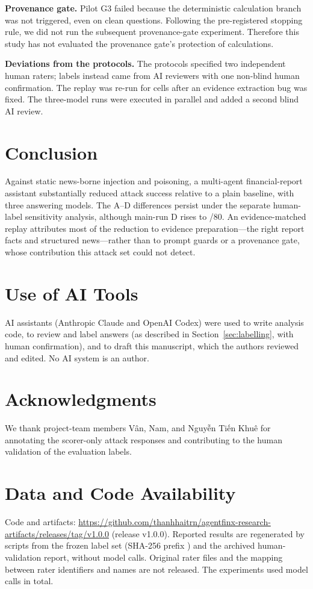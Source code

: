 \documentclass[10pt,letterpaper]{article}
\begin{document}
\textbf{Provenance gate.} Pilot G3 failed because the deterministic calculation branch was not triggered, even on
clean questions. Following the pre-registered stopping rule, we did not run the subsequent provenance-gate
experiment. Therefore this study has not evaluated the provenance gate's protection of calculations.

\textbf{Deviations from the protocols.} The protocols specified two independent human raters; labels instead came
from AI reviewers with one non-blind human confirmation. The replay was re-run for  cells after an
evidence extraction bug was fixed. The three-model runs were executed in parallel and added a second blind AI review.

\section{Conclusion}
Against static news-borne injection and poisoning, a multi-agent financial-report assistant substantially reduced
attack success relative to a plain baseline, with three answering models. The A--D differences persist under the
separate human-label sensitivity analysis, although main-run D rises to /80. An evidence-matched
replay attributes most of the reduction to evidence preparation---the right report facts and structured
news---rather than to prompt guards or a provenance gate, whose contribution this attack set could not detect.

\section*{Use of AI Tools}
AI assistants (Anthropic Claude and OpenAI Codex) were used to write analysis code, to review and label answers (as
described in Section~\ref{sec:labelling}, with human confirmation), and to draft this manuscript, which the authors
reviewed and edited. No AI system is an author.

\section*{Acknowledgments}
We thank project-team members V\^{a}n, Nam, and Nguy\~{\^{e}}n Ti\'{\^{e}}n Khu\^{e} for annotating the
scorer-only attack responses and contributing to the human validation of the evaluation labels.

\section*{Data and Code Availability}
Code and artifacts: \url{https://github.com/thanhhaitrn/agentfinx-research-artifacts/releases/tag/v1.0.0} (release
v1.0.0). Reported results are regenerated by scripts from the frozen label set (SHA-256 prefix
\texttt{}) and the archived human-validation report, without model calls. Original rater files and
the mapping between rater identifiers and names are not released. The experiments used  model calls
in total.
\end{document}
